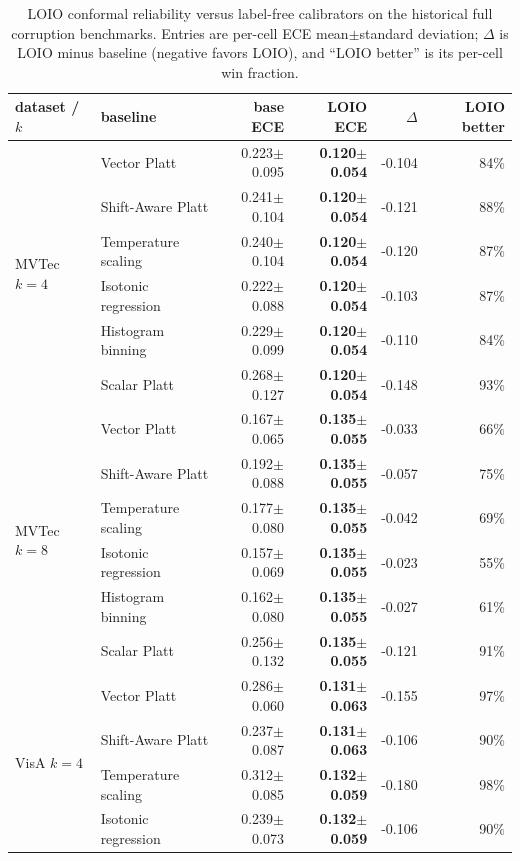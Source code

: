 \begin{table}[pos=t]
\centering
\caption{LOIO conformal reliability versus label-free calibrators on the historical full corruption benchmarks. Entries are per-cell ECE mean$\pm$standard deviation; $\Delta$ is LOIO minus baseline (negative favors LOIO), and ``LOIO better'' is its per-cell win fraction.}
\label{tab:scalar-calibrators}
\footnotesize
\setlength{\tabcolsep}{3pt}
\begin{tabular}{llrrrr}
\toprule
dataset / $k$ & baseline & base ECE & LOIO ECE & $\Delta$ & LOIO better \\
\midrule
\multirow{6}{*}{MVTec $k{=}4$} & Vector Platt & 0.223$\pm$0.095 & \textbf{0.120$\pm$0.054} & -0.104 & 84\% \\
 & Shift-Aware Platt & 0.241$\pm$0.104 & \textbf{0.120$\pm$0.054} & -0.121 & 88\% \\
 & Temperature scaling & 0.240$\pm$0.104 & \textbf{0.120$\pm$0.054} & -0.120 & 87\% \\
 & Isotonic regression & 0.222$\pm$0.088 & \textbf{0.120$\pm$0.054} & -0.103 & 87\% \\
 & Histogram binning & 0.229$\pm$0.099 & \textbf{0.120$\pm$0.054} & -0.110 & 84\% \\
 & Scalar Platt & 0.268$\pm$0.127 & \textbf{0.120$\pm$0.054} & -0.148 & 93\% \\
\midrule
\multirow{6}{*}{MVTec $k{=}8$} & Vector Platt & 0.167$\pm$0.065 & \textbf{0.135$\pm$0.055} & -0.033 & 66\% \\
 & Shift-Aware Platt & 0.192$\pm$0.088 & \textbf{0.135$\pm$0.055} & -0.057 & 75\% \\
 & Temperature scaling & 0.177$\pm$0.080 & \textbf{0.135$\pm$0.055} & -0.042 & 69\% \\
 & Isotonic regression & 0.157$\pm$0.069 & \textbf{0.135$\pm$0.055} & -0.023 & 55\% \\
 & Histogram binning & 0.162$\pm$0.080 & \textbf{0.135$\pm$0.055} & -0.027 & 61\% \\
 & Scalar Platt & 0.256$\pm$0.132 & \textbf{0.135$\pm$0.055} & -0.121 & 91\% \\
\midrule
\multirow{6}{*}{VisA $k{=}4$} & Vector Platt & 0.286$\pm$0.060 & \textbf{0.131$\pm$0.063} & -0.155 & 97\% \\
 & Shift-Aware Platt & 0.237$\pm$0.087 & \textbf{0.131$\pm$0.063} & -0.106 & 90\% \\
 & Temperature scaling & 0.312$\pm$0.085 & \textbf{0.132$\pm$0.059} & -0.180 & 98\% \\
 & Isotonic regression & 0.239$\pm$0.073 & \textbf{0.132$\pm$0.059} & -0.106 & 90\% \\

\end{tabular}
\end{table}
